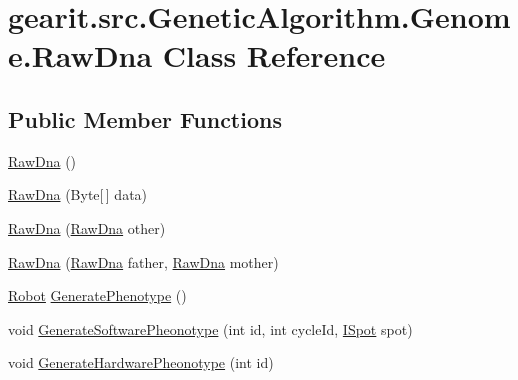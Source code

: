 \hypertarget{classgearit_1_1src_1_1_genetic_algorithm_1_1_genome_1_1_raw_dna}{\section{gearit.\+src.\+Genetic\+Algorithm.\+Genome.\+Raw\+Dna Class Reference}
\label{classgearit_1_1src_1_1_genetic_algorithm_1_1_genome_1_1_raw_dna}
}
\subsection*{Public Member Functions}
\begin{DoxyCompactItemize}
\item 
\hyperlink{classgearit_1_1src_1_1_genetic_algorithm_1_1_genome_1_1_raw_dna_abb118078be8e9384a335ecf3490d560c}{Raw\+Dna} ()
\item 
\hyperlink{classgearit_1_1src_1_1_genetic_algorithm_1_1_genome_1_1_raw_dna_af9d26afb6d55424876babbf0d0792163}{Raw\+Dna} (Byte\mbox{[}$\,$\mbox{]} data)
\item 
\hyperlink{classgearit_1_1src_1_1_genetic_algorithm_1_1_genome_1_1_raw_dna_af49327960cac59379153f59742778562}{Raw\+Dna} (\hyperlink{classgearit_1_1src_1_1_genetic_algorithm_1_1_genome_1_1_raw_dna}{Raw\+Dna} other)
\item 
\hyperlink{classgearit_1_1src_1_1_genetic_algorithm_1_1_genome_1_1_raw_dna_a5a85a5ed40098eb0403cf9fd2df46b90}{Raw\+Dna} (\hyperlink{classgearit_1_1src_1_1_genetic_algorithm_1_1_genome_1_1_raw_dna}{Raw\+Dna} father, \hyperlink{classgearit_1_1src_1_1_genetic_algorithm_1_1_genome_1_1_raw_dna}{Raw\+Dna} mother)
\item 
\hyperlink{classgearit_1_1src_1_1robot_1_1_robot}{Robot} \hyperlink{classgearit_1_1src_1_1_genetic_algorithm_1_1_genome_1_1_raw_dna_a99346135155ba4b2aa825574a6ff1f6c}{Generate\+Phenotype} ()
\item 
void \hyperlink{classgearit_1_1src_1_1_genetic_algorithm_1_1_genome_1_1_raw_dna_a0124374d9c8f9e3ed68fdb49c008903c}{Generate\+Software\+Pheonotype} (int id, int cycle\+Id, \hyperlink{interfacegearit_1_1src_1_1robot_1_1_i_spot}{I\+Spot} spot)
\item 
void \hyperlink{classgearit_1_1src_1_1_genetic_algorithm_1_1_genome_1_1_raw_dna_a3b37e3ca3cd5c52d3df1783a10e03793}{Generate\+Hardware\+Pheonotype} (int id)
\end{DoxyCompactItemize}
